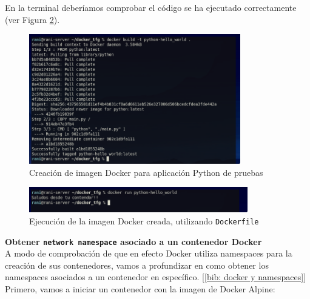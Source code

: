\documentclass[12pt]{article}
\begin{document}
\begin{enumerate}
	\noindent En la terminal deberíamos comprobar el código se ha ejecutado correctamente (ver Figura \ref{img: dockerfile python run}).
	
	\begin{figure}[h]
		\begin{center}
			\includegraphics[width=0.82\textwidth]{img/dockerfile_build.png}
			\caption{Creación de imagen Docker para aplicación Python de pruebas}
			\label{img: dockerfile python build}
		\end{center}
	\end{figure}

	\begin{figure}[h]
		\begin{center}
			\includegraphics[width=0.85\textwidth]{img/dockerfile_run.png}
			\caption{Ejecución de la imagen Docker creada, utilizando \texttt{Dockerfile}}
			\label{img: dockerfile python run}
		\end{center}
	\end{figure}
	
	\end{enumerate}
	
	\pagebreak
	
	\noindent \textbf{\large Obtener \texttt{network namespace} asociado a un contenedor Docker}\\
	
	\noindent A modo de comprobación de que en efecto Docker utiliza namespaces para la creación de sus contenedores, vamos a profundizar en como obtener los namespaces asociados a un contenedor en específico. [\ref{bib: docker y namespaces}] \\
	
	\noindent Primero, vamos a iniciar un contenedor con la imagen de Docker Alpine:
	
\end{document}
